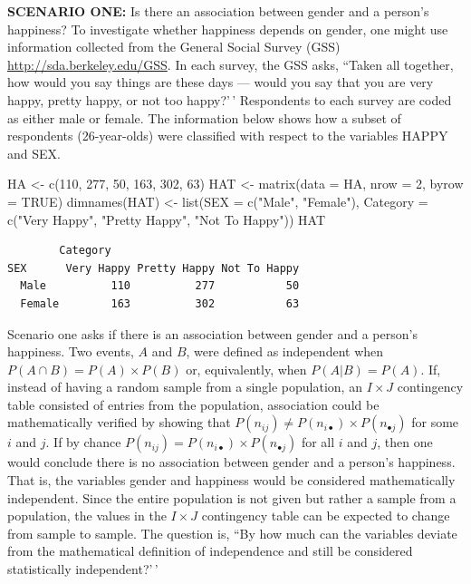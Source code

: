 \documentclass[
]{article}
\newenvironment{Shaded}{\begin{snugshade}}{\end{snugshade}}
\newcommand{\AttributeTok}[1]{\textcolor[rgb]{0.77,0.63,0.00}{#1}}
\newcommand{\ConstantTok}[1]{\textcolor[rgb]{0.00,0.00,0.00}{#1}}
\newcommand{\DecValTok}[1]{\textcolor[rgb]{0.00,0.00,0.81}{#1}}
\newcommand{\FunctionTok}[1]{\textcolor[rgb]{0.00,0.00,0.00}{#1}}
\newcommand{\NormalTok}[1]{#1}
\newcommand{\OtherTok}[1]{\textcolor[rgb]{0.56,0.35,0.01}{#1}}
\newcommand{\StringTok}[1]{\textcolor[rgb]{0.31,0.60,0.02}{#1}}
\begin{document}
\textbf{SCENARIO ONE:} Is there an association between gender and a person's happiness? To investigate whether happiness depends on gender, one might use information collected from the General Social Survey (GSS) \url{http://sda.berkeley.edu/GSS}. In each survey, the GSS asks, ``Taken all together, how would you say things are these days --- would you say that you are very happy, pretty happy, or not too happy?'\,' Respondents to each survey are coded as either male or female. The information below shows how a subset of respondents (26-year-olds) were classified with respect to the variables HAPPY and SEX.

\begin{Shaded}
\begin{Highlighting}[]
\NormalTok{HA }\OtherTok{\textless{}{-}} \FunctionTok{c}\NormalTok{(}\DecValTok{110}\NormalTok{, }\DecValTok{277}\NormalTok{, }\DecValTok{50}\NormalTok{, }\DecValTok{163}\NormalTok{, }\DecValTok{302}\NormalTok{, }\DecValTok{63}\NormalTok{)}
\NormalTok{HAT }\OtherTok{\textless{}{-}} \FunctionTok{matrix}\NormalTok{(}\AttributeTok{data =}\NormalTok{ HA, }\AttributeTok{nrow =} \DecValTok{2}\NormalTok{, }\AttributeTok{byrow =} \ConstantTok{TRUE}\NormalTok{)}
\FunctionTok{dimnames}\NormalTok{(HAT) }\OtherTok{\textless{}{-}} \FunctionTok{list}\NormalTok{(}\AttributeTok{SEX =} \FunctionTok{c}\NormalTok{(}\StringTok{"Male"}\NormalTok{, }\StringTok{"Female"}\NormalTok{),}
    \AttributeTok{Category =} \FunctionTok{c}\NormalTok{(}\StringTok{"Very Happy"}\NormalTok{, }\StringTok{"Pretty Happy"}\NormalTok{, }\StringTok{"Not To Happy"}\NormalTok{))}
\NormalTok{HAT}
\end{Highlighting}
\end{Shaded}

\begin{verbatim}
        Category
SEX      Very Happy Pretty Happy Not To Happy
  Male          110          277           50
  Female        163          302           63
\end{verbatim}

Scenario one asks if there is an association between gender and a person's happiness. Two events, \(A\) and \(B\), were defined as independent when \(P(A \cap B)=P(A)\times P(B)\) or, equivalently, when \(P(A|B)=P(A)\). If, instead of having a random sample from a single population, an \(I \times J\) contingency table consisted of entries from the population, association could be mathematically verified by showing that \(P(n_{ij}) \ne P(n_{i\bullet}) \times P(n_{\bullet j})\) for some \(i\) and \(j\). If by chance \(P(n_{ij}) = P(n_{i\bullet}) \times P(n_{\bullet j})\) for all \(i\) and \(j\), then one would conclude there is no association between gender and a person's happiness. That is, the variables gender and happiness would be considered mathematically independent. Since the entire population is not given but rather a sample from a population, the values in the \(I \times J\) contingency table can be expected to change from sample to sample. The question is, ``By how much can the variables deviate from the mathematical definition of independence and still be considered statistically independent?'\,'
\end{document}
